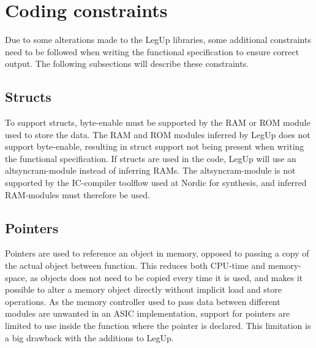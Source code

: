 \section{Coding constraints}
Due to some alterations made to the LegUp libraries, some additional constraints need to be followed when writing the functional specification to ensure correct output. The following subsections will describe these constraints.
\subsection{Structs}
To support structs, byte-enable must be supported by the RAM or ROM module used to store the data. The RAM and ROM modules inferred by LegUp does not support byte-enable, resulting in struct support not being present when writing the functional specification. If structs are used in the code, LegUp will use an altsyncram-module instead of inferring RAMs. The altsyncram-module is not supported by the IC-compiler toolflow used at Nordic for synthesis, and inferred RAM-modules must therefore be used. 
\subsection{Pointers}
Pointers are used to reference an object in memory, opposed to passing a copy of the actual object between function. This reduces both CPU-time and memory-space, as objects does not need to be copied every time it is used, and makes it possible to alter a memory object directly without implicit load and store operations. As the memory controller used to pass data between different modules are unwanted in an ASIC implementation, support for pointers are limited to use inside the function where the pointer is declared. This limitation is a big drawback with the additions to LegUp.
\subsection{}
